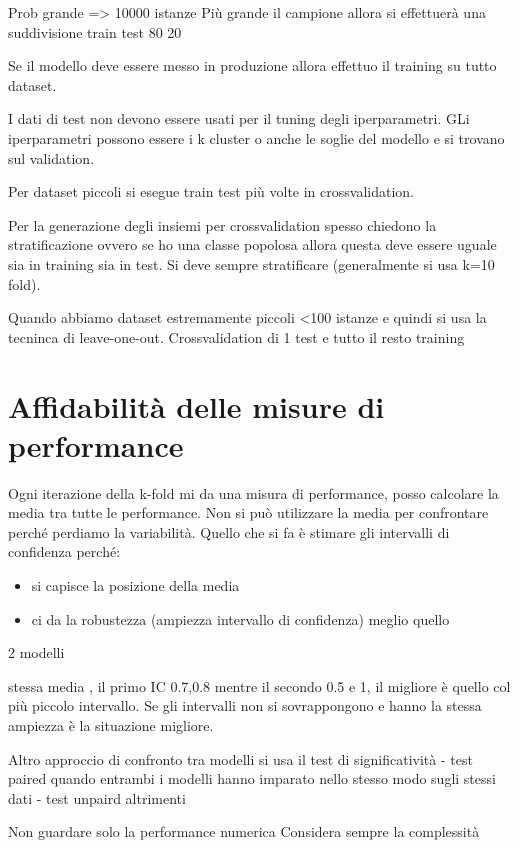 Prob grande => 10000 istanze 
Più grande il campione allora si effettuerà una suddivisione train test 80 20

Se il modello deve essere messo in produzione allora effettuo il training su tutto 
dataset.

I dati di test non devono essere usati per il tuning degli iperparametri. GLi
iperparametri possono essere i k cluster o anche le soglie del modello e si trovano
sul validation.

Per dataset piccoli si esegue train test più volte in crossvalidation.

Per la generazione degli insiemi per crossvalidation spesso chiedono la stratificazione
ovvero se ho una classe popolosa allora questa deve essere uguale sia in training sia in
test. Si deve sempre stratificare (generalmente si usa k=10 fold). 

Quando abbiamo dataset estremamente piccoli <100 istanze e quindi si usa la tecninca
di leave-one-out. Crossvalidation di 1 test e tutto il resto training

\section{Affidabilità delle misure di performance}
Ogni iterazione della k-fold mi da una misura di performance, posso calcolare la media
tra tutte le performance. Non si può utilizzare la media per confrontare perché 
perdiamo la variabilità. Quello che si fa è stimare gli intervalli di confidenza
perché:
\begin{itemize}
    \item si capisce la posizione della media
    \item ci da la robustezza  (ampiezza intervallo di confidenza) meglio quello
\end{itemize}
2 modelli

stessa media , il primo IC 0.7,0.8 mentre il secondo 0.5 e 1, il migliore è quello
col più piccolo intervallo. Se gli intervalli non si sovrappongono e hanno la 
stessa ampiezza è la situazione migliore.

Altro approccio di confronto tra modelli si usa il test di significatività 
- test paired quando entrambi i modelli hanno imparato nello stesso modo sugli stessi dati
- test unpaird altrimenti

Non guardare solo la performance numerica
Considera sempre la complessità